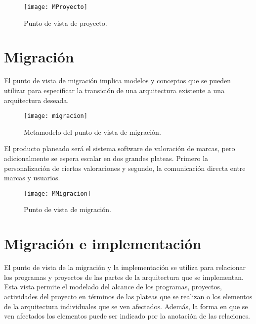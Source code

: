 \begin{figure}[H]
\centering
\texttt{[image: MProyecto]}
\caption{Punto de vista de proyecto.}
\end{figure}

\section{Migración}

El punto de vista de migración implica modelos y conceptos que se pueden utilizar para especificar la transición de una arquitectura existente a una arquitectura deseada.

\begin{figure}[H]
\centering
\texttt{[image: migracion]}
\caption{Metamodelo del punto de vista de migración.}
\end{figure}

El producto planeado será el sistema software de valoración de marcas, pero adicionalmente se espera escalar en dos grandes plateas. Primero la personalización de ciertas valoraciones y segundo, la comunicación directa entre marcas y usuarios.

\begin{figure}[H]
\centering
\texttt{[image: MMigracion]}
\caption{Punto de vista de migración.}
\end{figure}


\section{Migración e implementación}

El punto de vista de la migración y la implementación se utiliza para relacionar los programas y proyectos de las partes de la arquitectura que se implementan. Esta vista permite el modelado del alcance de los programas, proyectos, actividades del proyecto en términos de las plateas que se realizan o los elementos de la arquitectura individuales que se ven afectados. Además, la forma en que se ven afectados los elementos puede ser indicado por la anotación de las relaciones. 

